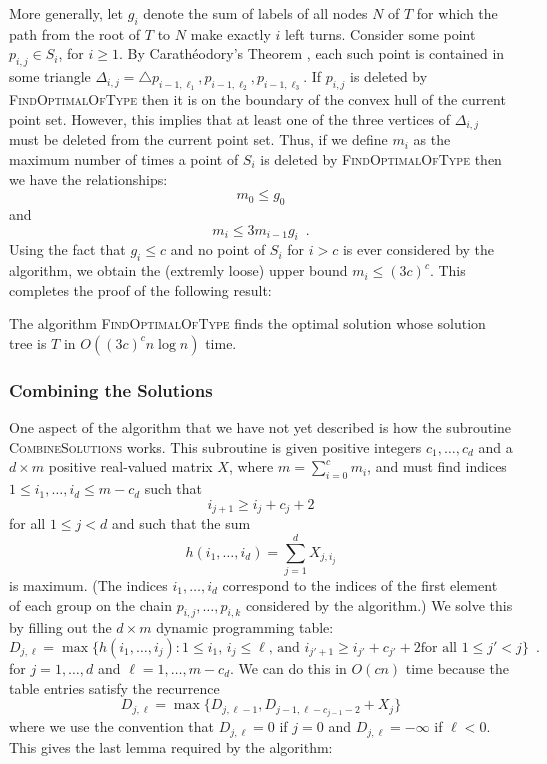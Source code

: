 \documentclass[lotsofwhite]{patmorin}
\begin{document}
More generally, let $g_i$ denote the sum of labels of all nodes $N$ of
$T$ for which the path from the root of $T$ to $N$ make exactly $i$
left turns.  Consider some point $p_{i,j}\in S_i$, for $i\ge 1$.  By
Carath\'eodory's Theorem \cite{chapter}, each such point is contained
in some triangle $\Delta_{i,j}=\triangle
p_{i-1,\ell_1},p_{i-1,\ell_2},p_{i-1,\ell_3}$. If $p_{i,j}$ is deleted
by \textsc{FindOptimalOfType} then it is on the boundary of the convex
hull of the current point set.  However, this implies that at least
one of the three vertices of $\Delta_{i,j}$ must be deleted from the
current point set.  Thus, if we define $m_i$ as the maximum number of
times a point of $S_i$ is deleted by \textsc{FindOptimalOfType} then
we have the relationships:
\[ m_0 \le g_0 \] 
and 
\[ m_i \le 3 m_{i-1} g_i \enspace .\]
Using the fact that $g_i \le c$ and no point of $S_{i}$ for $i> c$ is
ever considered by the algorithm, we obtain the (extremly loose) upper
bound $m_i \le (3c)^{c}$.  This completes the proof of the following
result:

\begin{lem}
The algorithm \textsc{FindOptimalOfType} finds the optimal solution
whose solution tree is $T$ in $O((3c)^c n\log n)$ time.
\end{lem}


\subsubsection{Combining the Solutions}

One aspect of the algorithm that we have not yet described is how the
subroutine \textsc{CombineSolutions} works.  This subroutine is given
positive integers $c_1,\ldots,c_d$ and a $d\times m$ positive
real-valued matrix $X$, where $m = \sum_{i=0}^{c} m_i$, and must find 
indices $1\le i_1,\ldots,i_d \le m-c_d$ such that
\[
     i_{j+1} \ge i_j + c_j + 2
\]
for all $1\le j < d$ and such that the sum
\[
      h(i_1,\ldots,i_d)=\sum_{j=1}^d X_{j,i_j}
\]
is maximum.  (The indices $i_1,\ldots,i_d$ correspond to the indices of the
first element of each group on the chain $p_{i,j},\ldots,p_{i,k}$
considered by the algorithm.)
We solve this by filling out the $d\times m$ dynamic
programming table:
\[
     D_{j,\ell} = \max\{h(i_1,\ldots,i_j):
      \mbox{$1\le i_1$, $i_j\le \ell$, and $i_{j'+1} \ge i_{j'}+c_{j'}+2$
             for all $1\le j'< j$}  \} \enspace .
\]
for $j=1,\ldots,d$ and $\ell=1,\ldots,m-c_d$.  We can do this in
$O(cn)$ time because the table entries satisfy the recurrence
\[
     D_{j,\ell} = \max\{D_{j,\ell-1},D_{j-1,\ell-c_{j-1}-2}+X_j \}
\]
where we use the convention that $D_{j,\ell} = 0$ if $j=0$ and
$D_{j,\ell}=-\infty$ if $\ell<0$.  This gives the last lemma required
by the algorithm:
\end{document}
